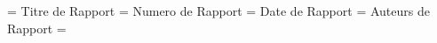
\titrederapport = {Titre de Rapport}
\numeroderapport = {Numero de Rapport}
\datederapport = {Date de Rapport}
\auteursderapport = {Auteurs de Rapport}
\titrespecial = {}

\faitepagetitre